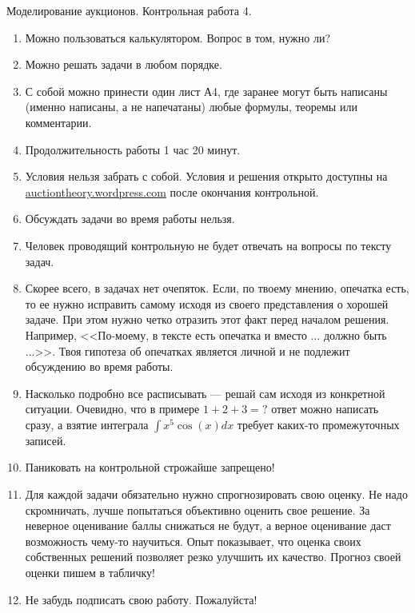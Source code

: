 \documentclass[11pt, openany]{book}
\numberwithin{equation}{page} %
\theoremstyle{definition} %
\theoremstyle{definition}
\theoremstyle{definition}
\begin{document}
\begin{Large}
Моделирование аукционов. Контрольная работа 4.
\end{Large}

\begin{enumerate}
\item Можно пользоваться калькулятором. Вопрос в том, нужно ли?
\item Можно решать задачи в любом порядке.
\item С собой можно принести один лист А4, где заранее могут быть написаны (именно написаны, а не напечатаны) любые формулы, теоремы или комментарии.
\item Продолжительность работы 1 час 20 минут.
\item Условия нельзя забрать с собой. Условия и решения открыто доступны на \url{auctiontheory.wordpress.com} после окончания контрольной.
\item Обсуждать задачи во время работы нельзя.
\item Человек проводящий контрольную не будет отвечать на вопросы по тексту задач.
\item Скорее всего, в задачах нет очепяток. Если, по твоему мнению, опечатка есть, то ее нужно исправить самому исходя из своего представления о хорошей задаче. При этом нужно четко отразить этот факт перед началом решения. Например, <<По-моему, в тексте есть опечатка и вместо ... должно быть ...>>. Твоя гипотеза об опечатках является личной и не подлежит обсуждению во время работы.
\item Насколько подробно все расписывать --- решай сам исходя из конкретной ситуации. Очевидно, что в примере $ 1+2+3=? $ ответ можно написать сразу, а взятие интеграла $ \int x^{5}\cos(x)dx $ требует каких-то промежуточных записей.
\item Паниковать на контрольной строжайше запрещено!
\item Для каждой задачи обязательно нужно спрогнозировать свою оценку. Не надо скромничать, лучше попытаться объективно оценить свое решение.  За неверное оценивание баллы снижаться не будут, а верное оценивание даст возможность чему-то научиться. Опыт показывает, что оценка своих собственных решений позволяет резко улучшить их качество. Прогноз своей оценки пишем в табличку!
\item Не забудь подписать свою работу. Пожалуйста!

\end{enumerate}
\end{document}
